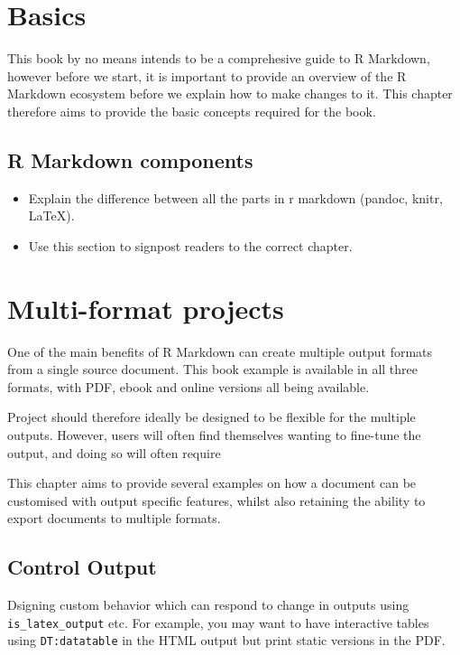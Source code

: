 \documentclass[]{book}
\providecommand{\tightlist}{%
  \setlength{\itemsep}{0pt}\setlength{\parskip}{0pt}}
\begin{document}
\chapter{Basics}\label{basics}

This book by no means intends to be a comprehesive guide to R Markdown,
however before we start, it is important to provide an overview of the R
Markdown ecosystem before we explain how to make changes to it. This
chapter therefore aims to provide the basic concepts required for the
book.

\section{R Markdown components}\label{r-markdown-components}

\begin{itemize}
\tightlist
\item
  Explain the difference between all the parts in r markdown (pandoc,
  knitr, LaTeX).
\item
  Use this section to signpost readers to the correct chapter.
\end{itemize}

\chapter{Multi-format projects}\label{multi-format-projects}

One of the main benefits of R Markdown can create multiple output
formats from a single source document. This book example is available in
all three formats, with PDF, ebook and online versions all being
available.

Project should therefore ideally be designed to be flexible for the
multiple outputs. However, users will often find themselves wanting to
fine-tune the output, and doing so will often require

This chapter aims to provide several examples on how a document can be
customised with output specific features, whilst also retaining the
ability to export documents to multiple formats.

\section{Control Output}\label{control-output}

Dsigning custom behavior which can respond to change in outputs using
\texttt{is\_latex\_output} etc. For example, you may want to have
interactive tables using \texttt{DT:datatable} in the HTML output but
print static versions in the PDF.
\end{document}
